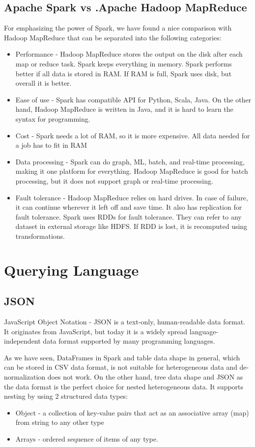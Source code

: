 \subsection{Apache Spark vs .Apache Hadoop MapReduce}
For emphasizing the power of Spark, we have found a nice comparison with Hadoop MapReduce that can be separated into the following categories: 
\begin{itemize}
	\item Performance - Hadoop MapReduce stores the output on the disk after each map or reduce task. Spark keeps everything in memory. Spark performs better if all data is stored in RAM. If RAM is full, Spark uses disk, but overall it is better.
	\item Ease of use - Spark has compatible API for Python, Scala, Java. On the other hand, Hadoop MapReduce is written in Java, and it is hard to learn the syntax for programming. 
	\item Cost - Spark needs a lot of RAM, so it is more expensive. All data needed for a job has to fit in RAM
	\item Data processing - Spark can do graph, ML, batch, and real-time processing, making it one platform for everything. Hadoop MapReduce is good for batch processing, but it does not support graph or real-time processing. 
	\item Fault tolerance - Hadoop MapReduce relies on hard drives. In case of failure, it can continue wherever it left off and save time. It also has replication for fault tolerance. Spark uses RDDs for fault tolerance. They can refer to any dataset in external storage like HDFS. If RDD is lost, it is recomputed using transformations.
\end{itemize}

\section{Querying Language}
\subsection{JSON}
\label{sec:JSON}
JavaScript Object Notation - JSON \cite{JSON}is a text-only, human-readable data format. It originates from JavaScript, but today it is a widely spread language-independent data format supported by many programming languages. 

As we have seen, DataFrames in Spark and table data shape in general, which can be stored in CSV data format, is not suitable for heterogeneous data and de-normalization does not work. On the other hand, tree data shape and JSON as the data format is the perfect choice for nested heterogeneous data. It supports nesting by using 2 structured data types:
\begin{itemize}
	\item Object - a collection of key-value pairs that act as an associative array (map) from string to any other type 
	\item Arrays - ordered sequence of items of any type. 
\end{itemize} 

